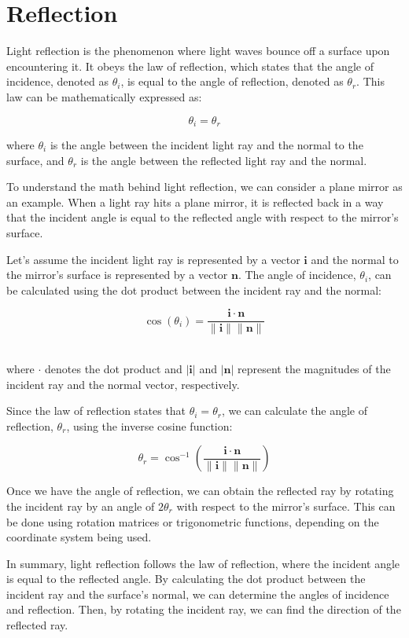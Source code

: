\chapter{Reflection}

Light reflection is the phenomenon where light waves bounce off a surface upon encountering it. It obeys the law of reflection, which states that the angle of incidence, denoted as $\theta_i$, is equal to the angle of reflection, denoted as $\theta_r$. This law can be mathematically expressed as:

$$\theta_i = \theta_r$$
 
where $\theta_i$ is the angle between the incident light ray and the normal to the surface, and $\theta_r$ is the angle between the reflected light ray and the normal.

To understand the math behind light reflection, we can consider a plane mirror as an example. When a light ray hits a plane mirror, it is reflected back in a way that the incident angle is equal to the reflected angle with respect to the mirror's surface.

Let's assume the incident light ray is represented by a vector $\mathbf{i}$ and the normal to the mirror's surface is represented by a vector $\mathbf{n}$. The angle of incidence, $\theta_i$, can be calculated using the dot product between the incident ray and the normal:

$$\cos(\theta_i) = \frac{{\mathbf{i} \cdot \mathbf{n}}}{{\|\mathbf{i}\| \|\mathbf{n}\|}}$$
​	
 
where $\cdot$ denotes the dot product and $|\mathbf{i}|$ and $|\mathbf{n}|$ represent the magnitudes of the incident ray and the normal vector, respectively.

Since the law of reflection states that $\theta_i = \theta_r$, we can calculate the angle of reflection, $\theta_r$, using the inverse cosine function:

$$\theta_r = \cos^{-1}\left(\frac{{\mathbf{i} \cdot \mathbf{n}}}{{\|\mathbf{i}\| \|\mathbf{n}\|}}\right)$$

Once we have the angle of reflection, we can obtain the reflected ray by rotating the incident ray by an angle of $2\theta_r$ with respect to the mirror's surface. This can be done using rotation matrices or trigonometric functions, depending on the coordinate system being used.

In summary, light reflection follows the law of reflection, where the incident angle is equal to the reflected angle. By calculating the dot product between the incident ray and the surface's normal, we can determine the angles of incidence and reflection. Then, by rotating the incident ray, we can find the direction of the reflected ray.